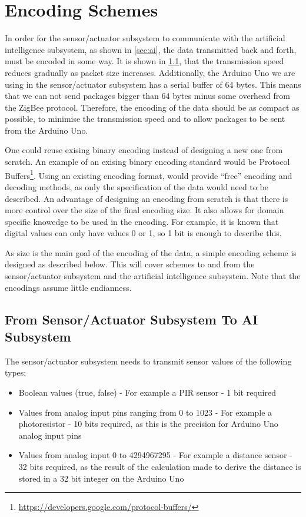 \section{Encoding Schemes}\label{sec:encoding}

In order for the sensor/actuator subsystem to communicate with the artificial intelligence subsystem, as shown in \cref{sec:ai}, the data transmitted back and forth, must be encoded in some way. It is shown in \cref{}, that the transmission speed reduces gradually as packet size increases. Additionally, the Arduino Uno we are using in the sensor/actuator subsystem has a serial buffer of 64 bytes. This means that we can not send packages bigger than 64 bytes minus some overhead from the ZigBee protocol. Therefore, the encoding of the data should be as compact as possible, to minimise the transmission speed and to allow packages to be sent from the Arduino Uno.

One could reuse exising binary encoding instead of designing a new one from scratch. An example of an exising binary encoding standard would be Protocol Buffers\footnote{\url{https://developers.google.com/protocol-buffers/}}. Using an existing encoding format, would provide \enquote{free} encoding and decoding methods, as only the specification of the data would need to be described. An advantage of designing an encoding from scratch is that there is more control over the size of the final encoding size. It also allows for domain specific knowedge to be used in the encoding. For example, it is known that digital values can only have values 0 or 1, so 1 bit is enough to describe this.

As size is the main goal of the encoding of the data, a simple encoding scheme is designed as described below. This will cover schemes to and from the sensor/actuator subsystem and the artificial intelligence subsystem. Note that the encodings assume little endianness.

\subsection{From Sensor/Actuator Subsystem To AI Subsystem}
The sensor/actuator subsystem needs to transmit sensor values of the following types:

\begin{itemize}
\item Boolean values (true, false) - For example a PIR sensor - 1 bit required
\item Values from analog input pins ranging from 0 to 1023 - For example a photoresistor - 10 bits required, as this is the precision for Arduino Uno analog input pins
\item Values from analog input 0 to 4294967295 - For example a distance sensor - 32 bits required, as the result of the calculation made to derive the distance is stored in a 32 bit integer on the Arduino Uno
\end{itemize}

